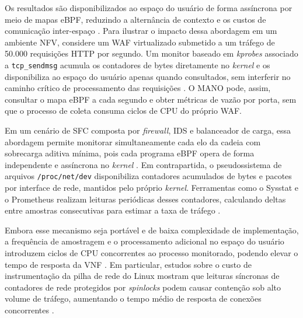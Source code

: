 Os resultados são disponibilizados ao espaço do usuário de forma assíncrona por meio de mapas eBPF, reduzindo a alternância de contexto e os custos de comunicação inter-espaço \cite{gregg_bpf_2019}.
Para ilustrar o impacto dessa abordagem em um ambiente NFV, considere um WAF virtualizado submetido a um tráfego de 50.000 requisições HTTP por segundo. Um monitor baseado em \textit{kprobes} associado a \texttt{tcp\_sendmsg} acumula os contadores de bytes diretamente no \textit{kernel} e os disponibiliza ao espaço do usuário apenas quando consultados, sem interferir no caminho crítico de processamento das requisições \cite{10.1109/NOMS47738.2020.9110434}. O MANO pode, assim, consultar o mapa eBPF a cada segundo e obter métricas de vazão por porta, sem que o processo de coleta consuma ciclos de CPU do próprio WAF.

Em um cenário de SFC composta por \textit{firewall}, IDS e balanceador de carga, essa abordagem permite monitorar simultaneamente cada elo da cadeia com sobrecarga aditiva mínima, pois cada programa eBPF opera de forma independente e assíncrona no \textit{kernel} \cite{kannan2024designing}.
Em contrapartida, o pseudossistema de arquivos \texttt{/proc/net/dev} disponibiliza contadores acumulados de bytes e pacotes por interface de rede, mantidos pelo próprio \textit{kernel}. Ferramentas como o Sysstat e o Prometheus realizam leituras periódicas desses contadores, calculando deltas entre amostras consecutivas para estimar a taxa de tráfego \cite{godard2024sysstat}.

Embora esse mecanismo seja portável e de baixa complexidade de implementação, a frequência de amostragem e o processamento adicional no espaço do usuário introduzem ciclos de CPU concorrentes ao processo monitorado, podendo elevar o tempo de resposta da VNF \cite{10.1109/NOMS47738.2020.9110434}. Em particular, estudos sobre o custo de instrumentação da pilha de rede do Linux mostram que leituras síncronas de contadores de rede protegidos por \textit{spinlocks} podem causar contenção sob alto volume de tráfego, aumentando o tempo médio de resposta de conexões concorrentes \cite{10.1145/3452296.3472888}.

